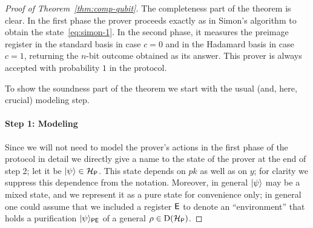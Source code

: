\begin{itemize}
\end{itemize}

\begin{proof}[Proof of Theorem~\ref{thm:comp-qubit}]
The completeness part of the theorem is clear. In the first phase the prover proceeds exactly as in Simon's algorithm to obtain the state~\eqref{eq:simon-1}. In the second phase, it measures the preimage register in the standard basis in case $c=0$ and in the Hadamard basis in case $c=1$, returning the $n$-bit outcome obtained as its answer. This prover is always accepted with probability $1$ in the protocol. 

To show the soundness part of the theorem we start with the usual (and, here, crucial) modeling step. 

\paragraph{Step 1: Modeling} Since we will not need to model the prover's actions in the  first phase of the protocol in detail we directly give a name to the state of the prover at the end of step 2; let it be $|\psi\rangle \in  \mathcal{H}_{{\textsf{P}}}$. This state depends on $pk$ as well as on $y$; for clarity we suppress this dependence from the notation. Moreover, in general $|\psi\rangle$ may be a mixed state, and we represent it as a pure state for convenience only; in general one could assume that we included a register ${\textsf{E}}$ to denote an ``environment'' that holds a purification $|\psi\rangle_{{\textsf{PE}}}$ of a general $\rho \in \mathrm{D}(\mathcal{H}_{{\textsf{P}}})$. 


\end{proof}
